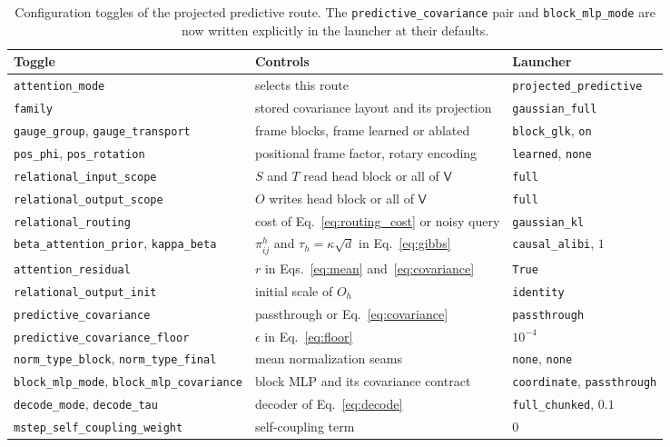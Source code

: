 \documentclass[11pt]{article}
\theoremstyle{definition}
\theoremstyle{remark}
\newcommand{\cfg}[1]{\texttt{#1}}
\begin{document}
\begin{table}[h]
\centering
\small
\begin{tabularx}{\textwidth}{@{}lXl@{}}
\toprule
Toggle & Controls & Launcher \\
\midrule
\cfg{attention\_mode} & selects this route & \cfg{projected\_predictive} \\
\cfg{family} & stored covariance layout and its projection & \cfg{gaussian\_full} \\
\cfg{gauge\_group}, \cfg{gauge\_transport} & frame blocks, frame learned or ablated & \cfg{block\_glk}, \cfg{on} \\
\cfg{pos\_phi}, \cfg{pos\_rotation} & positional frame factor, rotary encoding & \cfg{learned}, \cfg{none} \\
\cfg{relational\_input\_scope} & $S$ and $T$ read head block or all of $\mathsf V$ & \cfg{full} \\
\cfg{relational\_output\_scope} & $O$ writes head block or all of $\mathsf V$ & \cfg{full} \\
\cfg{relational\_routing} & cost of Eq.~\eqref{eq:routing_cost} or noisy query & \cfg{gaussian\_kl} \\
\cfg{beta\_attention\_prior}, \cfg{kappa\_beta} & $\pi_{ij}^{h}$ and $\tau_h=\kappa\sqrt d$ in Eq.~\eqref{eq:gibbs} & \cfg{causal\_alibi}, $1$ \\
\cfg{attention\_residual} & $r$ in Eqs.~\eqref{eq:mean} and~\eqref{eq:covariance} & \cfg{True} \\
\cfg{relational\_output\_init} & initial scale of $O_h$ & \cfg{identity} \\
\cfg{predictive\_covariance} & passthrough or Eq.~\eqref{eq:covariance} & \cfg{passthrough} \\
\cfg{predictive\_covariance\_floor} & $\epsilon$ in Eq.~\eqref{eq:floor} & $10^{-4}$ \\
\cfg{norm\_type\_block}, \cfg{norm\_type\_final} & mean normalization seams & \cfg{none}, \cfg{none} \\
\cfg{block\_mlp\_mode}, \cfg{block\_mlp\_covariance} & block MLP and its covariance contract & \cfg{coordinate}, \cfg{passthrough} \\
\cfg{decode\_mode}, \cfg{decode\_tau} & decoder of Eq.~\eqref{eq:decode} & \cfg{full\_chunked}, $0.1$ \\
\cfg{mstep\_self\_coupling\_weight} & self-coupling term & $0$ \\
\bottomrule
\end{tabularx}
\caption{Configuration toggles of the projected predictive route. The \cfg{predictive\_covariance} pair and \cfg{block\_mlp\_mode} are now written explicitly in the launcher at their defaults.}
\label{tab:map}
\end{table}
\end{document}
